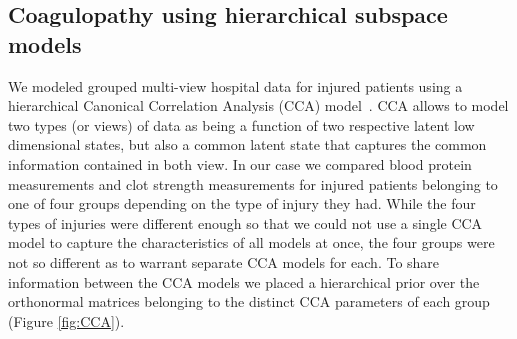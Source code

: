 \documentclass{article}
\begin{document}
\subsection{Coagulopathy using hierarchical subspace models}
We modeled grouped multi-view hospital data for injured patients using a hierarchical Canonical Correlation Analysis (CCA) model~\citep[chapt.~15.2]{murphy2012machine}. CCA allows to model two types (or views) of data as being a function of two respective latent low dimensional states, but also a common latent state that captures the common information contained in both view. In our case we compared blood protein measurements and clot strength measurements for injured patients belonging to one of four groups depending on the type of injury they had. While the four types of injuries were different enough so that we could not use a single CCA model to capture the characteristics of all models at once, the four groups were not so different as to warrant separate CCA models for each. To share information between the CCA models we placed a hierarchical prior over the orthonormal matrices belonging to the distinct CCA parameters of each group (Figure \ref{fig:CCA}).
\end{document}
